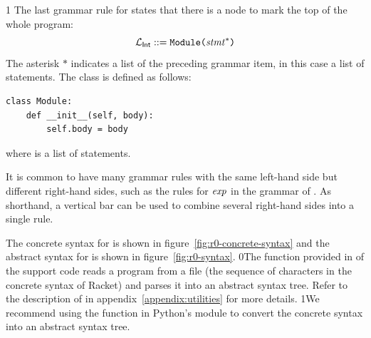 \documentclass[7x10]{TimesAPriori_MIT}%
\def\racketEd{0}
\def\pythonEd{1}
\def\edition{1}
\newcommand{\racket}[1]{{\if\edition\racketEd{#1}\fi}}
\newcommand{\pythonColor}[0]{}
\newcommand{\python}[1]{{\if\edition\pythonEd\pythonColor #1\fi}}
\numberwithin{theorem}{chapter}
\numberwithin{definition}{chapter}
\numberwithin{equation}{chapter}
\begin{document}
{\if\edition\pythonEd\pythonColor
The last grammar rule for \LangInt{} states that there is a
 node to mark the top of the whole program:
\[
  \mathcal{L}_{\mathsf{Int}}{} ::= \texttt{Module}\texttt{(} \mathit{stmt}^{*}\texttt{)}
\]
The asterisk $*$ indicates a list of the preceding grammar item, in
this case a list of statements.
%
The  class is defined as follows:
\begin{lstlisting}
class Module:
    def __init__(self, body):
        self.body = body
\end{lstlisting}
where  is a list of statements.
\fi}

It is common to have many grammar rules with the same left-hand side
but different right-hand sides, such as the rules for $\mathit{exp}$ in the
grammar of \LangInt{}. As shorthand, a vertical bar can be used to
combine several right-hand sides into a single rule.

The concrete syntax for \LangInt{} is shown in
figure~\ref{fig:r0-concrete-syntax} and the abstract syntax for
\LangInt{} is shown in figure~\ref{fig:r0-syntax}. %
%
\racket{The  function provided in
  \code{utilities.rkt} of the support code reads a program from a file
  (the sequence of characters in the concrete syntax of Racket) and
  parses it into an abstract syntax tree. Refer to the description of
  \code{read-program} in appendix~\ref{appendix:utilities} for more
  details.}
%
\python{We recommend using the  function in Python's
  \code{ast} module to convert the concrete syntax into an abstract
  syntax tree.}

\newcommand{\LintGrammarRacket}{
  \begin{array}{rcl}
    \Type &::=& \key{Integer} \\
    \Exp{} &::=& \Int{} \MID \CREAD \MID \CNEG{\Exp} \MID \CADD{\Exp}{\Exp}
      \MID \CSUB{\Exp}{\Exp}
  \end{array}
}
\newcommand{\LintASTRacket}{
  \begin{array}{rcl}
    \Type &::=& \key{Integer} \\
    \Exp{} &::=& \INT{\Int} \MID \READ{} \\
           &\MID& \NEG{\Exp} \MID \ADD{\Exp}{\Exp} \MID \SUB{\Exp}{\Exp}
  \end{array}
}
\newcommand{\LintGrammarPython}{
\begin{array}{rcl}
  \Exp &::=& \Int \MID \key{input\_int}\LP\RP \MID \key{-}\;\Exp \MID \Exp \; \key{+} \; \Exp \MID \Exp \; \key{-} \; \Exp \MID \LP\Exp\RP \\
  \Stmt &::=& \key{print}\LP \Exp \RP \MID \Exp
\end{array}
}
\newcommand{\LintASTPython}{
  \begin{array}{rcl}
  \Exp{} &::=& \INT{\Int} \MID \READ{} \\
         &\MID& \UNIOP{\key{USub()}}{\Exp} \MID \BINOP{\Exp}{\key{Add()}}{\Exp}\\
         &\MID& \BINOP{\Exp}{\key{Sub()}}{\Exp}\\
  \Stmt{} &::=& \PRINT{\Exp} \MID \EXPR{\Exp} 
\end{array}
}
\end{document}
